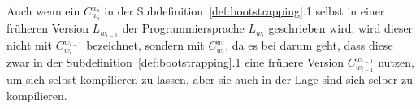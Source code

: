 \begin{Special_Paragraph}
  Auch wenn ein  $C_{w_i}^{w_i}$ in der Subdefinition~\ref{def:bootstrapping}{.1} selbst in einer früheren Version $L_{w_{i-1}}$ der Programmiersprache $L_{w_i}$ geschrieben wird, wird dieser nicht mit $C_{w_i}^{w_{i-1}}$ bezeichnet, sondern mit $C_{w_i}^{w_i}$, da es bei  darum geht, dass diese zwar in der Subdefinition~\ref{def:bootstrapping}{.1} eine frühere Version $C_{w_{i-1}}^{w_{i-1}}$ nutzen, um sich selbst kompilieren zu lassen, aber sie auch in der Lage sind sich selber zu kompilieren.
\end{Special_Paragraph}
